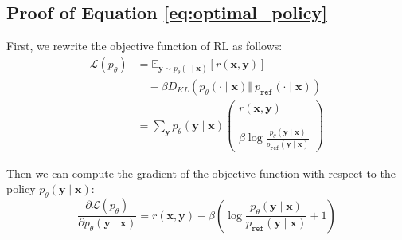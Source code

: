 \subsection{Proof of Equation \ref{eq:optimal_policy}}
\label{subsec:proof_of_optimal_policy}
First, we rewrite the objective function of RL as follows:
\begin{equation}
    \begin{aligned}
        \mathcal{L}(p_{\theta}) & = \mathbb{E}_{\boldsymbol{y}\sim p_{\theta}(\cdot\mid \boldsymbol{x})} \left[ r(\boldsymbol{x}, \boldsymbol{y}) \right]                                                                                                                                                            \\
                                & \quad - \beta D_{KL}\left(p_{\theta}\left(\cdot\mid \boldsymbol{x}\right) \Vert\ p_{\mathtt{ref}}\left(\cdot\mid \boldsymbol{x}\right)\right)                                                                                                                                      \\
                                & = \sum_{\boldsymbol{y}} p_{\theta}(\boldsymbol{y}\mid \boldsymbol{x}) \left(\begin{array}{c} r(\boldsymbol{x}, \boldsymbol{y}) \\
                                                                                                                      -                                     \\
                                                                                                                      \beta \log \frac{p_{\theta}(\boldsymbol{y}\mid \boldsymbol{x})}{p_{\mathtt{ref}}(\boldsymbol{y}\mid \boldsymbol{x})}\end{array}\right)
    \end{aligned}
\end{equation}

Then we can compute the gradient of the objective function with respect to the policy $p_{\theta}(\boldsymbol{y}\mid \boldsymbol{x})$:
\begin{equation}
    \frac{\partial \mathcal{L}(p_{\theta})}{\partial p_{\theta}(\boldsymbol{y}\mid \boldsymbol{x})} = r(\boldsymbol{x}, \boldsymbol{y}) - \beta \left(\log \frac{p_{\theta}(\boldsymbol{y}\mid \boldsymbol{x})}{p_{\mathtt{ref}}(\boldsymbol{y}\mid \boldsymbol{x})} + 1\right)
    \label{eq:gradient_of_objective_function}
\end{equation}

